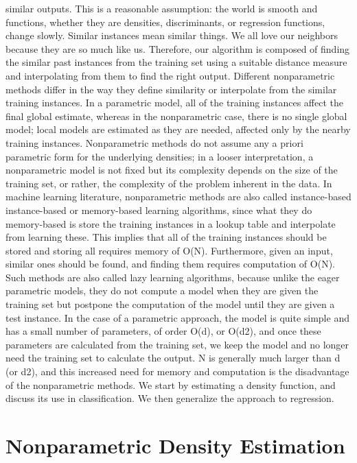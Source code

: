 similar outputs. This is a reasonable assumption: the world is smooth and functions, whether they are densities, discriminants, or regression functions, change slowly. Similar instances mean similar things. We all love our neighbors because they are so much like us. Therefore, our algorithm is composed of finding the similar past instances from the training set using a suitable distance measure and interpolating from them to find the right output. Different nonparametric methods differ in the way they define similarity or interpolate from the similar training instances. In a parametric model, all of the training instances affect the final global estimate, whereas in the nonparametric case, there is no single global model; local models are estimated as they are needed, affected only by the nearby training instances. Nonparametric methods do not assume any a priori parametric form for the underlying densities; in a looser interpretation, a nonparametric model is not fixed but its complexity depends on the size of the training set, or rather, the complexity of the problem inherent in the data. In machine learning literature, nonparametric methods are also called instance-based instance-based or memory-based learning algorithms, since what they do memory-based is store the training instances in a lookup table and interpolate from learning these. This implies that all of the training instances should be stored and storing all requires memory of O(N). Furthermore, given an input, similar ones should be found, and finding them requires computation of O(N). Such methods are also called lazy learning algorithms, because unlike the eager parametric models, they do not compute a model when they are given the training set but postpone the computation of the model until they are given a test instance. In the case of a parametric approach, the model is quite simple and has a small number of parameters, of order O(d), or O(d2), and once these parameters are calculated from the training set, we keep the model and no longer need the training set to calculate the output. N is generally much larger than d (or d2), and this increased need for memory and computation is the disadvantage of the nonparametric methods. We start by estimating a density function, and discuss its use in classification. We then generalize the approach to regression.

\section{Nonparametric Density Estimation}

